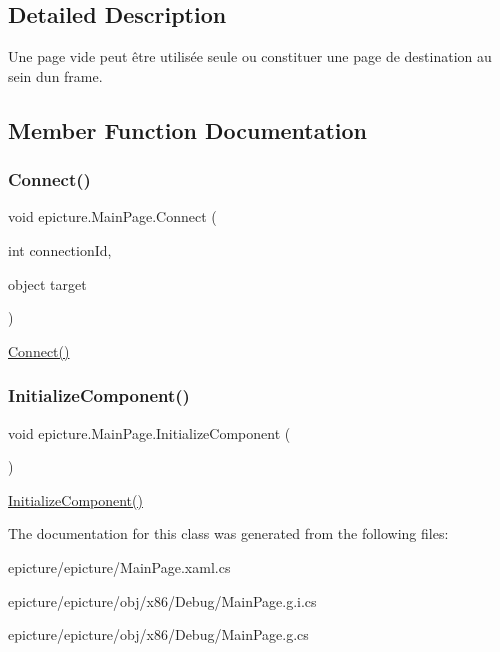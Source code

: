 \subsection{Detailed Description}
Une page vide peut être utilisée seule ou constituer une page de destination au sein d\textquotesingle{}un frame. 



\subsection{Member Function Documentation}
\mbox{\label{classepicture_1_1_main_page_addc532a5876a946b3fa6859fedbe8eb7}} 
\subsubsection{\texorpdfstring{Connect()}{Connect()}}
{\footnotesize\ttfamily void epicture.\+Main\+Page.\+Connect (\begin{DoxyParamCaption}\item[{int}]{connection\+Id,  }\item[{object}]{target }\end{DoxyParamCaption})}



\mbox{\hyperlink{classepicture_1_1_main_page_addc532a5876a946b3fa6859fedbe8eb7}{Connect()}} 

\mbox{\label{classepicture_1_1_main_page_ae68560cfe8407bb0ad02d82217f93ef3}} 
\subsubsection{\texorpdfstring{Initialize\+Component()}{InitializeComponent()}}
{\footnotesize\ttfamily void epicture.\+Main\+Page.\+Initialize\+Component (\begin{DoxyParamCaption}{ }\end{DoxyParamCaption})}



\mbox{\hyperlink{classepicture_1_1_main_page_ae68560cfe8407bb0ad02d82217f93ef3}{Initialize\+Component()}} 



The documentation for this class was generated from the following files\+:\begin{DoxyCompactItemize}
\item 
epicture/epicture/Main\+Page.\+xaml.\+cs\item 
epicture/epicture/obj/x86/\+Debug/Main\+Page.\+g.\+i.\+cs\item 
epicture/epicture/obj/x86/\+Debug/Main\+Page.\+g.\+cs\end{DoxyCompactItemize}

